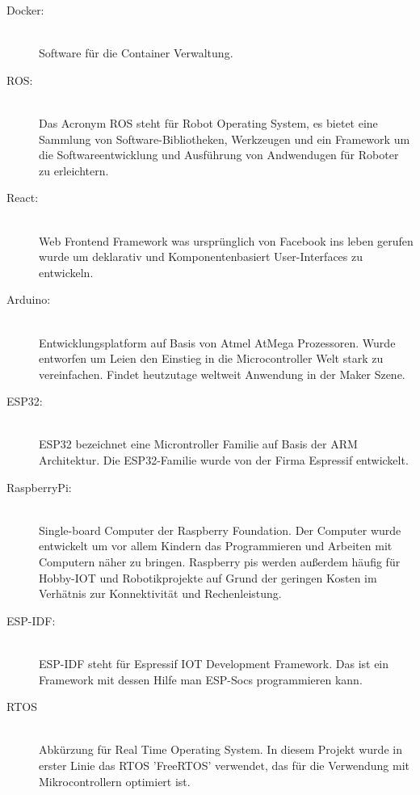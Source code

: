 \begin{flushleft}
    \begin{description}
        \item[Docker:]\hfill\\
        Software für die Container Verwaltung.

        \item[ROS:]\hfill\\
        Das Acronym ROS steht für Robot Operating System, es bietet eine Sammlung von Software-Bibliotheken, Werkzeugen und ein Framework um die Softwareentwicklung und Ausführung von Andwendugen für Roboter zu erleichtern. \cite{ros}

        \item[React:]\hfill\\
        Web Frontend Framework was ursprünglich von Facebook ins leben gerufen wurde um deklarativ und Komponentenbasiert User-Interfaces zu entwickeln. \cite{reactframework}

        \item[Arduino:]\hfill\\
        Entwicklungsplatform auf Basis von Atmel AtMega Prozessoren. Wurde entworfen um Leien den Einstieg in die Microcontroller
        Welt stark zu vereinfachen. Findet heutzutage weltweit Anwendung in der Maker Szene. \cite{arduino}

        \item[ESP32:]\hfill\\
        ESP32 bezeichnet eine Microntroller Familie auf Basis der ARM Architektur.
        Die ESP32-Familie wurde von der Firma Espressif entwickelt. \cite{esp32}

        \item[RaspberryPi:]\hfill\\
        Single-board Computer der Raspberry Foundation. Der Computer wurde entwickelt um vor allem Kindern das Programmieren und Arbeiten mit Computern näher zu bringen.
        Raspberry pis werden außerdem häufig für Hobby-IOT und Robotikprojekte auf Grund der geringen Kosten im Verhätnis zur Konnektivität und Rechenleistung.\cite{raspberry_pi}
        
        \item[ESP-IDF:]\hfill\\
        ESP-IDF steht für Espressif IOT Development Framework. Das ist ein Framework mit dessen Hilfe man ESP-Socs programmieren kann. \cite{esp_idf}
        
        \item[RTOS]\hfill\\
        Abkürzung für Real Time Operating System. 
        In diesem Projekt wurde in erster Linie das RTOS 'FreeRTOS' verwendet, das für die Verwendung mit Mikrocontrollern optimiert ist. \cite{freertos}
        

\end{description}
\end{flushleft}
